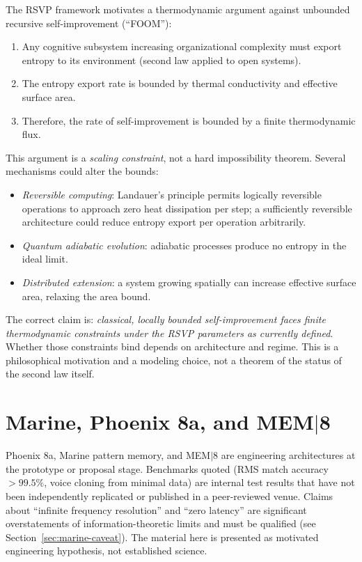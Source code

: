 \documentclass[12pt, a4paper]{article}
\theoremstyle{plain}
\theoremstyle{definition}
\theoremstyle{remark}
\begin{document}
The RSVP framework motivates a thermodynamic argument against
unbounded recursive self-improvement (``FOOM''):
\begin{enumerate}
  \item Any cognitive subsystem increasing organizational complexity
        must export entropy to its environment
        (second law applied to open systems).
  \item The entropy export rate is bounded by thermal conductivity
        and effective surface area.
  \item Therefore, the rate of self-improvement is bounded by a
        finite thermodynamic flux.
\end{enumerate}
This argument is a \emph{scaling constraint}, not a hard impossibility
theorem.
Several mechanisms could alter the bounds:
\begin{itemize}
  \item \emph{Reversible computing}: Landauer's principle permits
        logically reversible operations to approach zero heat
        dissipation per step; a sufficiently reversible architecture
        could reduce entropy export per operation arbitrarily.
  \item \emph{Quantum adiabatic evolution}: adiabatic processes
        produce no entropy in the ideal limit.
  \item \emph{Distributed extension}: a system growing spatially
        can increase effective surface area, relaxing the area bound.
\end{itemize}
The correct claim is: \emph{classical, locally bounded self-improvement
faces finite thermodynamic constraints under the RSVP parameters as
currently defined}.
Whether those constraints bind depends on architecture and regime.
This is a philosophical motivation and a modeling choice, not a theorem
of the status of the second law itself.

\section{Marine, Phoenix 8a, and MEM$|$8}
\label{sec:phoenix}

\begin{prototype}
  Phoenix 8a, Marine pattern memory, and MEM$|$8 are engineering
  architectures at the prototype or proposal stage.
  Benchmarks quoted (RMS match accuracy $> 99.5\%$, voice cloning
  from minimal data) are internal test results that have not been
  independently replicated or published in a peer-reviewed venue.
  Claims about ``infinite frequency resolution'' and ``zero latency''
  are significant overstatements of information-theoretic limits
  and must be qualified (see Section~\ref{sec:marine-caveat}).
  The material here is presented as motivated engineering hypothesis,
  not established science.
\end{prototype}
\end{document}
